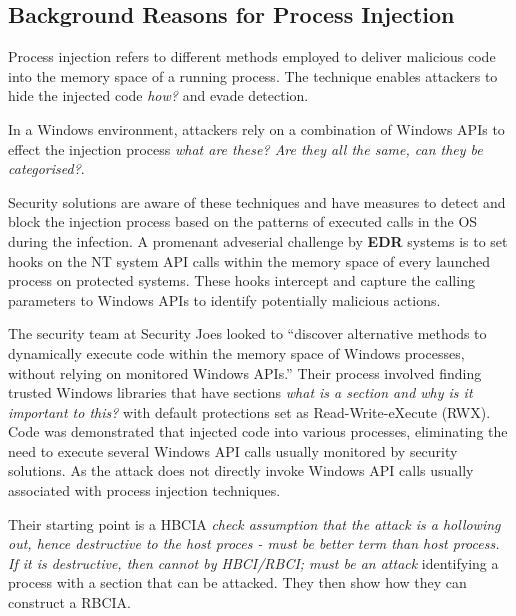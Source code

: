 \documentclass{article}
\begin{document}
\subsection{Background Reasons for Process Injection}

Process injection refers to different methods employed to deliver malicious code into the memory space of a
running process.  The technique enables attackers to hide the injected code \textit{how?} and evade detection.

In a Windows \faWindows \space environment, attackers rely on a combination of Windows APIs to effect the injection
process \textit{what are these? Are they all the same, can they be categorised?}.

Security solutions are aware of these techniques and have measures to detect and block the injection process based
on the patterns of executed calls in the OS during the infection.  A promenant adveserial challenge by \textbf{EDR}
systems is to set hooks on the NT system API calls within the memory space of every launched process on protected
systems.  These hooks intercept and capture the calling parameters to Windows APIs to identify potentially malicious actions.

The security team at Security Joes looked to ``discover alternative methods to dynamically execute code within
the memory space of Windows processes, without relying on monitored Windows APIs.''  Their process involved
finding trusted Windows libraries that have sections \textit{what is a section and why is it important to this?}
with default protections set as Read-Write-eXecute (RWX).  Code was demonstrated that injected code into various
processes, eliminating the need to execute several Windows API calls usually monitored by security solutions.
As the attack does not directly invoke Windows API calls usually associated with process injection techniques.

Their starting point is a HBCIA \textit{check assumption that the attack is a hollowing out, hence destructive to the host proces - must be better term than host process. If it is destructive, then cannot by HBCI/RBCI; must be an attack} identifying a process with a section that can be attacked.  They then show how they can construct a RBCIA.
\end{document}
